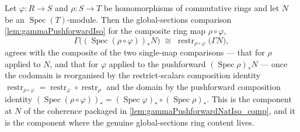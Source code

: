 \begin{lemma}



  \label{lem:gammaPushforwardIso_comp}
  Let \(\varphi : R \to S\) and \(\rho : S \to T\) be homomorphisms of commutative
  rings and let \(N\) be an \(\operatorname{Spec}(T)\)-module. Then the global-sections
  comparison \cref{lem:gammaPushforwardIso} for the composite ring map
  \(\rho\circ\varphi\),
  \[
    \Gamma\bigl((\operatorname{Spec}(\rho\circ\varphi))_* N\bigr)
      \;\cong\;
    \operatorname{restr}_{\rho\circ\varphi}\bigl(\Gamma N\bigr),
  \]
  agrees with the composite of the two single-map comparisons — that for \(\rho\)
  applied to \(N\), and that for \(\varphi\) applied to the pushforward
  \((\operatorname{Spec}\rho)_* N\) — once the codomain is reorganised by the
  restrict-scalars composition identity
  \(\operatorname{restr}_{\rho\circ\varphi} = \operatorname{restr}_\varphi \circ
  \operatorname{restr}_\rho\) and the domain by the pushforward composition identity
  \((\operatorname{Spec}(\rho\circ\varphi))_* = (\operatorname{Spec}\varphi)_* \circ
  (\operatorname{Spec}\rho)_*\). This is the component at \(N\) of the coherence
  packaged in \cref{lem:gammaPushforwardNatIso_comp}, and it is the component where the
  genuine global-sections ring content lives.
\end{lemma}

